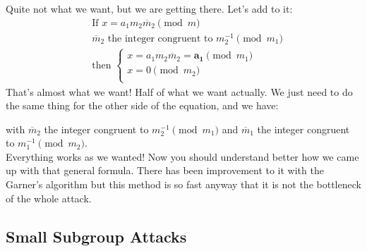 \documentclass[a4paper,11pt,twocolumn]{article}
\begin{document}
Quite not what we want, but we are getting there. Let's add to it:
\begin{align*}
&\text{If } x = a_1  m_2 \overline{m}_2 \pmod{m}\\
&\overline{m}_2 \text{ the integer congruent to } m_2^{-1} \pmod{m_1}\\
&\text{then } \begin{cases}
    x = a_1 m_2 \overline{m}_2 = \boldsymbol{a_1} \pmod{m_1}\\
x = 0 \pmod{m_2}\\
\end{cases}
\end{align*}
That's almost what we want! Half of what we want actually. We just need to do the same thing for the other side of the equation, and we have:
\begin{center}\end{center}
with $\overline{m}_2$ the integer congruent to $m_2^{-1} \pmod{m_1}$ and $\overline{m}_1$ the integer congruent to $m_1^{-1} \pmod{m_2}$.\\

Everything works as we wanted! Now you should understand better how we came up with that general formula. There has been improvement to it with the Garner's algorithm but this method is so fast anyway that it is not the bottleneck of the whole attack.

\subsection{Small Subgroup Attacks}
\end{document}
